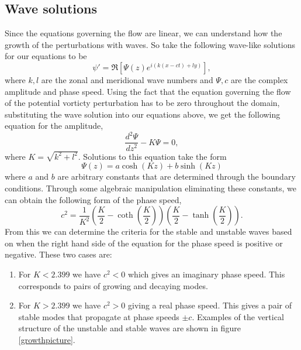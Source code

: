 \documentclass[a4paper,12pt]{article}
\begin{document}
\subsection{Wave solutions}
Since the equations governing the flow are linear, we can understand how the growth of the perturbations with waves. So take the following wave-like solutions for our equations to be
\begin{equation}
  \psi' = \Re\left[\Psi(z)e^{i(k(x-ct)+ly)}\right],
\end{equation}
where $k,l$ are the zonal and meridional wave numbers and $\Psi,c$ are the complex amplitude and phase speed. Using the fact that the equation governing the flow of the potential vorticty perturbation has to be zero throughout the domain, substituting the wave solution into our equations above, we get the following equation for the amplitude, 
\begin{equation}
  \frac{d^2\Psi}{dz^2} - K\Psi = 0,
\end{equation}
where $K=\sqrt{k^2+l^2}$. Solutions to this equation take the form 
\begin{equation}
  \Psi(z) = a\cosh(Kz)+b\sinh(Kz)
\end{equation}
where $a$ and $b$ are arbitrary constants that are determined through the boundary conditions. Through some algebraic manipulation eliminating these constants, we can obtain the following form of the phase speed,
\begin{equation}
  c^2 = \frac{1}{K^2}\left(\frac{K}{2}-\coth\left(\frac{K}{2}\right)\right)\left(\frac{K}{2}-\tanh\left(\frac{K}{2}\right)\right).
  \label{phasespeed}
\end{equation}
From this we can determine the criteria for the stable and unstable waves based on when the right hand side of the equation for the phase speed is positive or negative. These two cases are:
\begin{enumerate}
  \item For $K<2.399$ we have $c^2<0$ which gives an imaginary phase speed. This corresponds to pairs of growing and decaying modes. 
  \item For $K>2.399$ we have $c^2>0$ giving a real phase speed. This gives a pair of stable modes that propagate at phase speeds $\pm c$. Examples of the vertical structure of the unstable and stable waves are shown in figure \ref{growthpicture}.
\end{enumerate}
\end{document}
